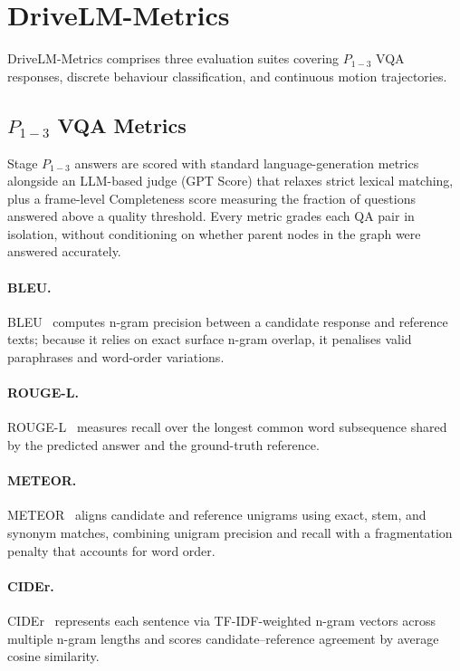 \section{DriveLM-Metrics}\label{drivelm:app:metrics}

DriveLM-Metrics comprises three evaluation suites covering $P_{1-3}$ VQA responses, discrete behaviour classification, and continuous motion trajectories.

\subsection{\texorpdfstring{$P_{1-3}$}{P1-3} VQA Metrics}\label{drivelm:app:metrics_vqa}

Stage $P_{1-3}$ answers are scored with standard language-generation metrics alongside an LLM-based judge (GPT Score) that relaxes strict lexical matching, plus a frame-level Completeness score measuring the fraction of questions answered above a quality threshold. Every metric grades each QA pair in isolation, without conditioning on whether parent nodes in the graph were answered accurately.

\paragraph{BLEU.}
BLEU~\cite{papineni2002bleu} computes n-gram precision between a candidate response and reference texts; because it relies on exact surface n-gram overlap, it penalises valid paraphrases and word-order variations.

\paragraph{ROUGE-L.}
ROUGE-L~\cite{lin2004rouge} measures recall over the longest common word subsequence shared by the predicted answer and the ground-truth reference.

\paragraph{METEOR.}
METEOR~\cite{lavie-agarwal-2007-meteor} aligns candidate and reference unigrams using exact, stem, and synonym matches, combining unigram precision and recall with a fragmentation penalty that accounts for word order.

\paragraph{CIDEr.}
CIDEr~\cite{vedantam2015cider} represents each sentence via TF-IDF-weighted n-gram vectors across multiple n-gram lengths and scores candidate--reference agreement by average cosine similarity.

